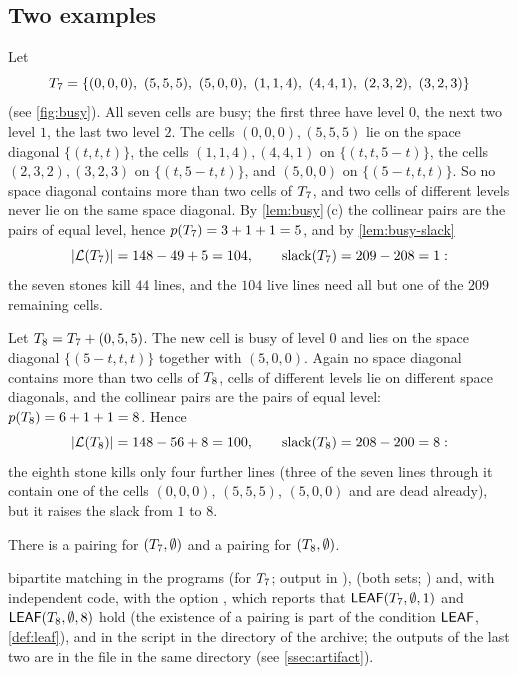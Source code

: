 \subsection{Two examples}\label{ssec:examples}

\begin{example}\label{ex:T7}
Let
\[
  \Tseven=\{(0,0,0),\ (5,5,5),\ (5,0,0),\ (1,1,4),\ (4,4,1),\ (2,3,2),\ (3,2,3)\}
\]
(see \cref{fig:busy}). All seven cells are busy; the first three have level $0$, the next two level
$1$, the last two level $2$. The cells $(0,0,0),(5,5,5)$ lie on the space diagonal $\{(t,t,t)\}$, the
cells $(1,1,4),(4,4,1)$ on $\{(t,t,5-t)\}$, the cells $(2,3,2),(3,2,3)$ on $\{(t,5-t,t)\}$, and $(5,0,0)$ on
$\{(5-t,t,t)\}$. So no space diagonal contains more than two cells of $T_7$, and two cells of
different levels never lie on the same space diagonal. By \cref{lem:busy}\,(c) the collinear pairs are
the pairs of equal level, hence $p(T_7)=3+1+1=5$, and by \cref{lem:busy-slack}
\[
  |\mathcal{L}(T_7)|=148-49+5=104,\qquad \operatorname{slack}(T_7)=209-208=1 :
\]
the seven stones kill $44$ lines, and the $104$ live lines need all but one of the $209$ remaining cells.
\end{example}

\begin{example}\label{ex:T8}
Let $T_8=T_7+(0,5,5)$. The new cell is busy of level $0$ and lies on the space diagonal
$\{(5-t,t,t)\}$ together with $(5,0,0)$. Again no space diagonal contains more than two cells of
$T_8$, cells of different levels lie on different space diagonals, and the collinear pairs are the
pairs of equal level: $p(T_8)=6+1+1=8$. Hence
\[
  |\mathcal{L}(T_8)|=148-56+8=100,\qquad \operatorname{slack}(T_8)=208-200=8 :
\]
the eighth stone kills only four further lines (three of the seven lines through it contain one of the
cells $(0,0,0)$, $(5,5,5)$, $(5,0,0)$ and are dead already), but it raises the slack from $1$ to $8$.
\end{example}

\begin{fact}\label{fact:T-pairings}
There is a pairing for $(T_7,\emptyset)$ and a pairing for $(T_8,\emptyset)$.

\established bipartite matching in the programs  (for $T_7$; output in
),  (both sets; ) and,
with independent code,  with the option , which reports that $\mathsf{LEAF}(T_7,\emptyset,1)$
and $\mathsf{LEAF}(T_8,\emptyset,8)$ hold (the existence of a pairing is part of the condition $\mathsf{LEAF}$,
\cref{def:leaf}), and in the script  in the directory  of the archive; the
outputs of the last two are in the file  in the same directory (see
\cref{ssec:artifact}).
\end{fact}

